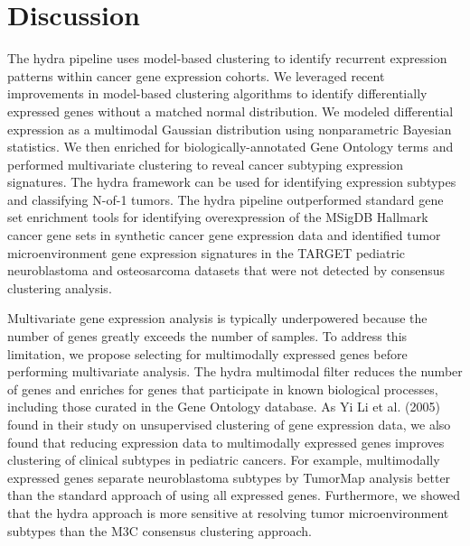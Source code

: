 \documentclass[10pt,letterpaper]{article}
\begin{document}
\section*{Discussion}
The hydra pipeline uses model-based clustering to identify recurrent expression patterns within cancer gene expression cohorts. We leveraged recent improvements in model-based clustering algorithms to identify differentially expressed genes without a matched normal distribution. We modeled differential expression as a multimodal Gaussian distribution using nonparametric Bayesian statistics. We then enriched for biologically-annotated Gene Ontology terms and performed multivariate clustering to reveal cancer subtyping expression signatures. The hydra framework can be used for identifying expression subtypes and classifying N-of-1 tumors. The hydra pipeline outperformed standard gene set enrichment tools for identifying overexpression of the MSigDB Hallmark cancer gene sets in synthetic cancer gene expression data and identified tumor microenvironment gene expression signatures in the TARGET pediatric neuroblastoma and osteosarcoma datasets that were not detected by consensus clustering analysis. 

Multivariate gene expression analysis is typically underpowered because the number of genes greatly exceeds the number of samples. To address this limitation, we propose selecting for multimodally expressed genes before performing multivariate analysis. The hydra multimodal filter reduces the number of genes and enriches for genes that participate in known biological processes, including those curated in the Gene Ontology database. As Yi Li et al. (2005) found in their study on unsupervised clustering of gene expression data, we also found that reducing expression data to multimodally expressed genes improves clustering of clinical subtypes in pediatric cancers. For example, multimodally expressed genes separate neuroblastoma subtypes by TumorMap analysis better than the standard approach of using all expressed genes. Furthermore, we showed that the hydra approach is more sensitive at resolving tumor microenvironment subtypes than the M3C consensus clustering approach.
\end{document}
